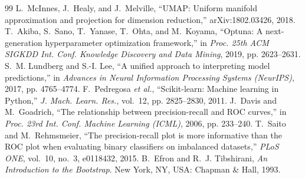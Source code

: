 \documentclass[conference]{IEEEtran}
\begin{document}
\begin{thebibliography}{99}
 L.~McInnes, J.~Healy, and J.~Melville, ``UMAP: Uniform manifold approximation and projection for dimension reduction,'' arXiv:1802.03426, 2018.
 T.~Akiba, S.~Sano, T.~Yanase, T.~Ohta, and M.~Koyama, ``Optuna: A next-generation hyperparameter optimization framework,'' in \emph{Proc. 25th ACM SIGKDD Int. Conf. Knowledge Discovery and Data Mining}, 2019, pp. 2623--2631.
 S.~M. Lundberg and S.-I. Lee, ``A unified approach to interpreting model predictions,'' in \emph{Advances in Neural Information Processing Systems (NeurIPS)}, 2017, pp. 4765--4774.
 F.~Pedregosa \emph{et al.}, ``Scikit-learn: Machine learning in Python,'' \emph{J. Mach. Learn. Res.}, vol.~12, pp. 2825--2830, 2011.
 J.~Davis and M.~Goadrich, ``The relationship between precision-recall and ROC curves,'' in \emph{Proc. 23rd Int. Conf. Machine Learning (ICML)}, 2006, pp. 233--240.
 T.~Saito and M.~Rehmsmeier, ``The precision-recall plot is more informative than the ROC plot when evaluating binary classifiers on imbalanced datasets,'' \emph{PLoS ONE}, vol.~10, no.~3, e0118432, 2015.
 B.~Efron and R.~J. Tibshirani, \emph{An Introduction to the Bootstrap}. New York, NY, USA: Chapman \& Hall, 1993.
\end{thebibliography}
\end{document}
